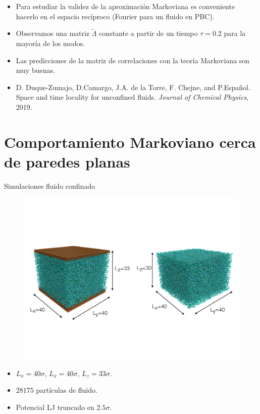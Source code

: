 \documentclass{beamer}
\begin{document}
\begin{frame}
  \begin{itemize}
    \item<1-> Para estudiar la validez de la aproximación Markoviana es conveniente hacerlo en el \alert{espacio recíproco} (Fourier para un fluido en PBC). 
    \item<2-> Observamos una \alert{matriz $\tilde{\Lambda}$ constante} a partir de un tiempo $\tau=0.2$ para la mayoría de los modos.  
    \item<3-> Las predicciones de la matriz de correlaciones con la teoría Markoviana son muy buenas. 
    \item<4-> D. Duque-Zumajo, D.Camargo, J.A. de la Torre, F. Chejne, and P.Espa\~nol. Space and time locality for unconfined fluids. \textit{Journal of Chemical Physics}, 2019.
  \end{itemize}

\end{frame}




\section{Comportamiento Markoviano cerca de paredes planas}

\begin{frame}{Simulaciones fluido confinado}
\begin{figure}
    \centering
    \includegraphics[width=0.8\linewidth]{dim-sim-pbc-walls}
\end{figure}
    \begin{itemize}
      \item $L_x=40\sigma$, $L_x=40\sigma$, $L_z=33\sigma$.
     \item $28175$ partículas de fluido. 
     \item Potencial LJ truncado en $2.5\sigma$.
    \end{itemize}
\end{frame}
\end{document}
